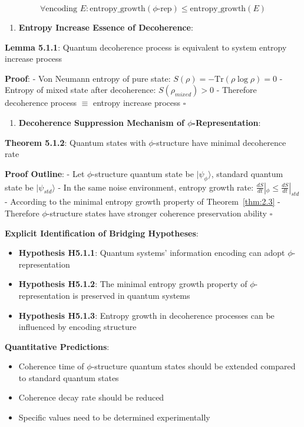 \begin{equation}
\forall \text{encoding } E: \text{entropy\_growth}(\text{$\phi$-rep}) \leq \text{entropy\_growth}(E)
\end{equation}

\begin{enumerate}
\item \textbf{Entropy Increase Essence of Decoherence}:
\end{enumerate}
   \textbf{Lemma 5.1.1}: Quantum decoherence process is equivalent to system entropy increase process
\label{lemma:5.1.1}
   
   \textbf{Proof}:
   - Von Neumann entropy of pure state: $S(\rho) = -\text{Tr}(\rho \log \rho) = 0$
   - Entropy of mixed state after decoherence: $S(\rho_{mixed}) > 0$
   - Therefore decoherence process $\equiv$ entropy increase process $\square$

\begin{enumerate}
\item \textbf{Decoherence Suppression Mechanism of $\phi$-Representation}:
\end{enumerate}
   \textbf{Theorem 5.1.2}: Quantum states with $\phi$-structure have minimal decoherence rate
\label{thm:5.1.2}
   
   \textbf{Proof Outline}:
   - Let $\phi$-structure quantum state be $|\psi_\phi\rangle$, standard quantum state be $|\psi_{std}\rangle$
   - In the same noise environment, entropy growth rate: $\frac{dS}{dt}|_\phi \leq \frac{dS}{dt}|_{std}$
   - According to the minimal entropy growth property of Theorem~\ref{thm:2.3}
   - Therefore $\phi$-structure states have stronger coherence preservation ability $\square$

\textbf{Explicit Identification of Bridging Hypotheses}:
\begin{itemize}
\item \textbf{Hypothesis H5.1.1}: Quantum systems' information encoding can adopt $\phi$-representation
\item \textbf{Hypothesis H5.1.2}: The minimal entropy growth property of $\phi$-representation is preserved in quantum systems
\item \textbf{Hypothesis H5.1.3}: Entropy growth in decoherence processes can be influenced by encoding structure
\end{itemize}

\textbf{Quantitative Predictions}:
\begin{itemize}
\item Coherence time of $\phi$-structure quantum states should be extended compared to standard quantum states
\item Coherence decay rate should be reduced
\item Specific values need to be determined experimentally
\end{itemize}

